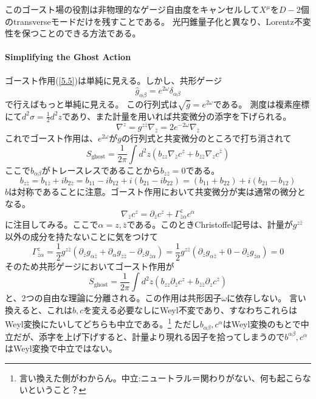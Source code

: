 \documentclass[10pt]{jsarticle}
\newcommand{\kakko}[1]{\left(#1 \right)} %
\newcommand{\del}{{\partial}} %
\begin{document}
このゴースト場の役割は非物理的なゲージ自由度をキャンセルして$X^{\mu}$を$D-2$個のtransverseモードだけを残すことである。
光円錐量子化と異なり、Lorentz不変性を保つことのできる方法である。
\paragraph{Simplifying the Ghost Action}
ゴースト作用(\ref{5.5})は単純に見える。しかし、共形ゲージ
\begin{equation}
  \hat{g}_{\alpha\beta}=e^{2\omega}\delta_{\alpha\beta}
\end{equation}
で行えばもっと単純に見える。
この行列式は$\sqrt{\hat{g}}=e^{2\omega}$である。
測度は複素座標にて$d^{2}\sigma=\frac{1}{2}d^{2}z$であり、また計量を用いれば共変微分の添字を下げられる。
\begin{equation}
  \nabla^{z}=g^{z\bar{z}}\nabla_{\bar{z}}=2e^{-2\omega}\nabla_{\bar{z}}
\end{equation}
これでゴースト作用は、$e^{2\omega}$が$g$の行列式と共変微分のところで打ち消されて
\begin{equation}
  S_{\mathrm{ghost}}=\frac{1}{2\pi}\int d^{2}z \kakko{b_{zz}\nabla_{\bar{z}}c^{z}+b_{\bar{z}\bar{z}}\nabla_{z}c^{\bar{z}}}
\end{equation}
ここで$b_{\alpha\beta}$がトレースレスであることから$b_{z\bar{z}}=0$である。
\begin{equation}
  b_{z\bar{z}}=b_{1\bar{z}}+ib_{2\bar{z}}=b_{11}-ib_{12}+i(b_{21}-ib_{22})=(b_{11}+b_{22})+i(b_{21}-b_{12})
\end{equation}
$b$は対称であることに注意。ゴースト作用において共変微分が実は通常の微分となる。
\begin{equation}
  \nabla_{\bar{z}}c^{z}=\del_{\bar{z}}c^{z}+\Gamma^{z}_{\bar{z}\alpha}c^{\alpha}
\end{equation}
に注目してみる。ここで$\alpha=z,\bar{z}$である。このときChristoffel記号は、計量が$g^{z\bar{z}}$以外の成分を持たないことに気をつけて
\begin{equation}
  \Gamma^{z}_{\bar{z}\alpha}=\frac{1}{2}g^{z\bar{z}}(\del_{\bar{z}}g_{\alpha \bar{z}}+\del_{\alpha}g_{\bar{z}\bar{z}}-\del_{\bar{z}}g_{\bar{z}\alpha})=\frac{1}{2}g^{z\bar{z}}(\del_{\bar{z}}g_{\alpha \bar{z}}+0-\del_{\bar{z}}g_{\bar{z}\alpha})=0
\end{equation}
そのため共形ゲージにおいてゴースト作用が
\begin{equation}
  S_{\mathrm{ghost}}=\frac{1}{2\pi}\int d^{2}z \kakko{b_{zz}\del_{\bar{z}}c^{z}+b_{\bar{z}\bar{z}}\del_{z}c^{\bar{z}}}
\end{equation}
と、2つの自由な理論に分離される。この作用は共形因子$\omega$に依存しない。
言い換えると、これは$b,c$を変える必要なしにWeyl不変であり、すなわちこれらはWeyl変換にたいしてどちらも中立である。\footnote{言い換えた側がわからん。中立:ニュートラル＝関わりがない、何も起こらないということ？}
ただし$b_{\alpha\beta},c^{\alpha}$はWeyl変換のもとで中立だが、添字を上げ下げすると、計量より現れる因子を拾ってしまうので$b^{\alpha\beta},c^{\alpha}$はWeyl変換で中立ではない。
\end{document}

